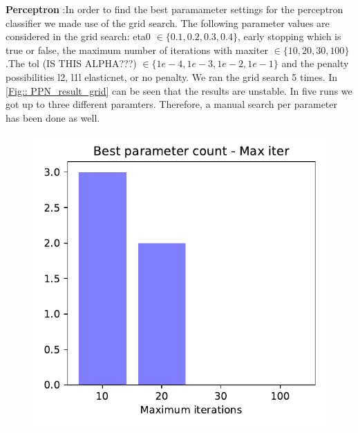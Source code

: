 \documentclass[11pt]{article}
\begin{document}
%
\textbf{Perceptron }:In order to find the best paramameter settings for the perceptron classifier we made use of the grid search. The following parameter values are considered in the grid search: eta0 $\in \{0.1, 0.2, 0.3, 0.4\}$, early stopping which is true or false, the maximum number of iterations with maxiter $\in \{10, 20, 30, 100\}$.The tol (IS THIS ALPHA???) $\in \{1e-4,1e-3,1e-2,1e-1\}$ and the penalty possibilities l2, l1l elasticnet, or no penalty. We ran the grid search 5 times. In \ref{Fig:: PPN_result_grid} can be seen that the results are unstable. In five runs we got up to three different paramters. Therefore, a manual search per parameter has been done as well. 
%
\begin{figure}[h]
\begin{minipage}[l]{0.3\textwidth}
\includegraphics[width=1\linewidth]{bridges/Best_parameter_count_max_iter.pdf}
\end{minipage}
\begin{minipage}[l]{0.3\textwidth}

\end{minipage}
\end{figure}
\end{document}

